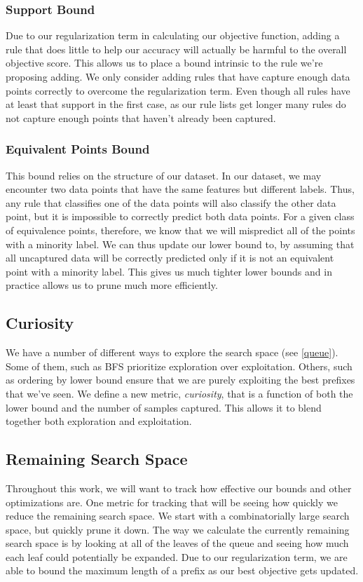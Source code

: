 \subsubsection{Support Bound}
Due to our regularization term in calculating our objective function, adding a rule that does little to help our accuracy will actually be harmful to the overall objective score.
This allows us to place a bound intrinsic to the rule we're proposing adding.
We only consider adding rules that have capture enough data points correctly to overcome the regularization term.
Even though all rules have at least that support in the first case, as our rule lists get longer many rules do not capture enough points that haven't already been captured.

\subsubsection{Equivalent Points Bound}
This bound relies on the structure of our dataset.
In our dataset, we may encounter two data points that have the same features but different labels.
Thus, any rule that classifies one of the data points will also classify the other data point, but it is impossible to correctly predict both data points.
For a given class of equivalence points, therefore, we know that we will mispredict all of the points with a minority label.
We can thus update our lower bound to, by assuming that all uncaptured data will be correctly predicted only if it is not an equivalent point with a minority label.
This gives us much tighter lower bounds and in practice allows us to prune much more efficiently.

\subsection{Curiosity}
We have a number of different ways to explore the search space (see \ref{queue}).
Some of them, such as BFS prioritize exploration over exploitation.
Others, such as ordering by lower bound ensure that we are purely exploiting the best prefixes that we've seen.
We define a new metric, \textit{curiosity}, that is a function of both the lower bound and the number of samples captured.
This allows it to blend together both exploration and exploitation.

\subsection{Remaining Search Space}
Throughout this work, we will want to track how effective our bounds and other optimizations are.
One metric for tracking that will be seeing how quickly we reduce the remaining search space.
We start with a combinatorially large search space, but quickly prune it down.
The way we calculate the currently remaining search space is by looking at all of the leaves of the queue and seeing how much each leaf could potentially be expanded.
Due to our regularization term, we are able to bound the maximum length of a prefix as our best objective gets updated.